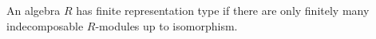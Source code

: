 An algebra $R$ has finite representation type if there are only finitely many
indecomposable $R$-modules up to isomorphism.
